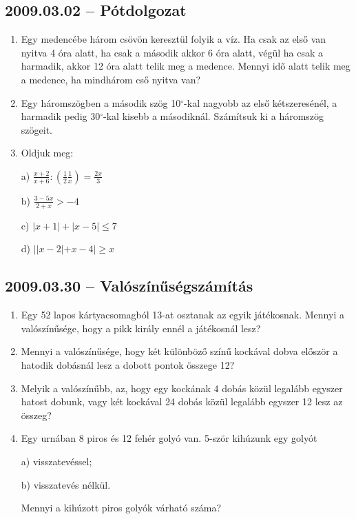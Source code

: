\documentclass{article}
\begin{document}
\subsection*{2009.03.02 -- Pótdolgozat}
 
\begin{enumerate}
 
\item Egy medencébe három csövön keresztül folyik a víz. Ha csak az első van nyitva 4 óra alatt, ha csak a második akkor 6 óra alatt, végül ha csak a harmadik, akkor 12 óra alatt telik meg a medence. Mennyi idő alatt telik meg a medence, ha mindhárom cső nyitva van?
 
\item Egy háromszögben a második szög 10$^{\circ}$-kal nagyobb az első kétszeresénél, a harmadik pedig 30$^{\circ}$-kal kisebb a másodiknál. Számítsuk ki a háromszög szögeit.
 
\item Oldjuk meg:
 
a) $\displaystyle{\frac{x+2}{x+6}}:\left(\displaystyle{\frac{1}{2}}\displaystyle{\frac{1}{x}}\right)=\displaystyle{\frac{2x}{3}}$
 
b) $\displaystyle{\frac{3-5x}{2+x}}>-4$
 
c) $|x+1|+|x-5|\le 7$
 
d) $||x-2|+x-4|\ge x$
 
\end{enumerate}
 
\subsection*{2009.03.30 -- Valószínűségszámítás}
 
\begin{enumerate}
 
\item Egy 52 lapos kártyacsomagból 13-at osztanak az egyik játékosnak. Mennyi a valószínűsége, hogy a pikk király ennél a játékosnál lesz?
 
\item Mennyi a valószínűsége, hogy két különböző színű kockával dobva először a hatodik dobásnál lesz a  dobott pontok összege 12?
 
\item Melyik a valószínűbb, az, hogy egy kockának 4 dobás közül legalább egyszer hatost dobunk, vagy két kockával 24 dobás közül legalább egyszer 12 lesz az összeg?
 
\item Egy urnában 8 piros és 12 fehér golyó van. 5-ször kihúzunk egy golyót
 
   a) visszatevéssel;
   
   b) visszatevés nélkül.
   
Mennyi a kihúzott piros golyók várható száma?
 
\end{enumerate}
 
\end{document}
